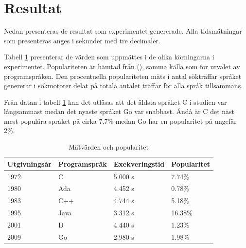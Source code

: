 \documentclass[12pt,swedish]{article}
\begin{document}
\newpage
\section{Resultat}
Nedan presenteras de resultat som experimentet genererade. Alla tidsmätningar som presenteras anges i sekunder med tre decimaler.

\begin{table}[H]
Tabell \ref{table:result} presenterar de värden som uppmättes i de olika körningarna i experimentet. Populariteten är hämtad från  (\citeyear{tiobe}), samma källa som för urvalet av programspråken. Den procentuella populariteten mäts i antal sökträffar språket genererar i sökmotorer delat på totala antalet träffar för alla språk tillsammans.

Från datan i tabell \ref{table:result} kan det utläsas att det äldsta språket C i studien var långsammast medan det nyaste språket Go var snabbast. Ändå är C det näst mest populära språket på cirka 7.7\% medan Go har en popularitet på ungefär 2\%.
\begin{center}
\caption{Mätvärden och popularitet}
\label{table:result}
\begin{tabular}{@{}llll@{}}
\toprule
Utgivningsår & Programspråk & Exekveringstid & Popularitet \\ \midrule
1972         & C            & 5.000 s        & 7.74\%      \\
1980         & Ada          & 4.452 s        & 0.78\%      \\
1983         & C++          & 4.744 s        & 5.18\%      \\
1995         & Java         & 3.312 s        & 16.38\%     \\
2001         & D            & 4.440 s        & 1.23\%      \\
2009         & Go           & 2.980 s        & 1.98\%      \\ \bottomrule
\end{tabular}
\end{center}
\end{table}
\end{document}
